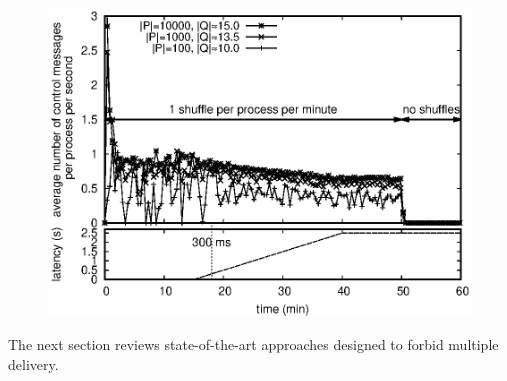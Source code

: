 \begin{figure}
  \begin{center}
    \includegraphics[width=0.8\columnwidth]{./img/controlmessages.eps}
    \caption{\label{fig:controlmessages}}
  \end{center}
\end{figure}



The next section reviews state-of-the-art approaches designed to forbid multiple
delivery.




